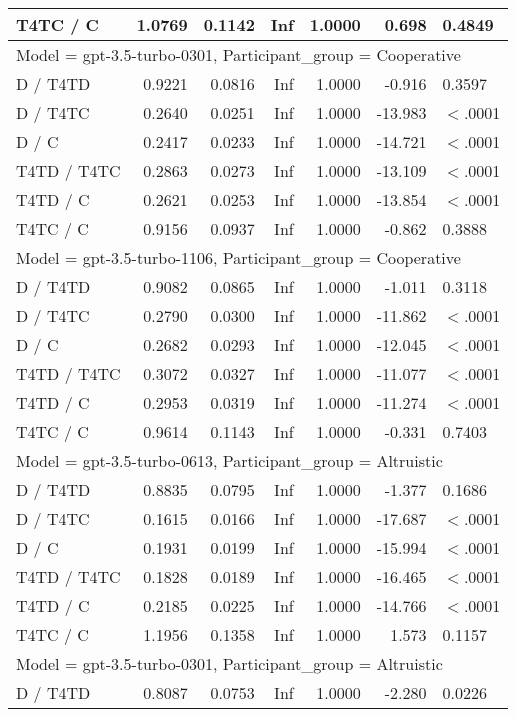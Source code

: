 \begin{table}[ht]
\begin{tabular}{lrrrrrl}
  T4TC / C & 1.0769 & 0.1142 & Inf & 1.0000 & 0.698 & 0.4849 \\ 
   \hline
\multicolumn{7}{l}{Model = gpt-3.5-turbo-0301, Participant_group = Cooperative}\\
D / T4TD & 0.9221 & 0.0816 & Inf & 1.0000 & -0.916 & 0.3597 \\ 
  D / T4TC & 0.2640 & 0.0251 & Inf & 1.0000 & -13.983 & $<$.0001 \\ 
  D / C & 0.2417 & 0.0233 & Inf & 1.0000 & -14.721 & $<$.0001 \\ 
  T4TD / T4TC & 0.2863 & 0.0273 & Inf & 1.0000 & -13.109 & $<$.0001 \\ 
  T4TD / C & 0.2621 & 0.0253 & Inf & 1.0000 & -13.854 & $<$.0001 \\ 
  T4TC / C & 0.9156 & 0.0937 & Inf & 1.0000 & -0.862 & 0.3888 \\ 
   \hline
\multicolumn{7}{l}{Model = gpt-3.5-turbo-1106, Participant_group = Cooperative}\\
D / T4TD & 0.9082 & 0.0865 & Inf & 1.0000 & -1.011 & 0.3118 \\ 
  D / T4TC & 0.2790 & 0.0300 & Inf & 1.0000 & -11.862 & $<$.0001 \\ 
  D / C & 0.2682 & 0.0293 & Inf & 1.0000 & -12.045 & $<$.0001 \\ 
  T4TD / T4TC & 0.3072 & 0.0327 & Inf & 1.0000 & -11.077 & $<$.0001 \\ 
  T4TD / C & 0.2953 & 0.0319 & Inf & 1.0000 & -11.274 & $<$.0001 \\ 
  T4TC / C & 0.9614 & 0.1143 & Inf & 1.0000 & -0.331 & 0.7403 \\ 
   \hline
\multicolumn{7}{l}{Model = gpt-3.5-turbo-0613, Participant_group = Altruistic}\\
D / T4TD & 0.8835 & 0.0795 & Inf & 1.0000 & -1.377 & 0.1686 \\ 
  D / T4TC & 0.1615 & 0.0166 & Inf & 1.0000 & -17.687 & $<$.0001 \\ 
  D / C & 0.1931 & 0.0199 & Inf & 1.0000 & -15.994 & $<$.0001 \\ 
  T4TD / T4TC & 0.1828 & 0.0189 & Inf & 1.0000 & -16.465 & $<$.0001 \\ 
  T4TD / C & 0.2185 & 0.0225 & Inf & 1.0000 & -14.766 & $<$.0001 \\ 
  T4TC / C & 1.1956 & 0.1358 & Inf & 1.0000 & 1.573 & 0.1157 \\ 
   \hline
\multicolumn{7}{l}{Model = gpt-3.5-turbo-0301, Participant_group = Altruistic}\\
D / T4TD & 0.8087 & 0.0753 & Inf & 1.0000 & -2.280 & 0.0226 \\ 

\end{tabular}
\end{table}

